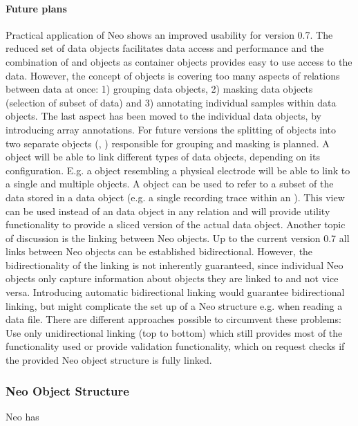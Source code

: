\paragraph{Future plans}
Practical application of Neo shows an improved usability for version 0.7. The reduced set of data objects facilitates data access and performance and the combination of  and  objects as container objects provides easy to use access to the data. However, the concept of  objects is covering too many aspects of relations between data at once: 1) grouping data objects, 2) masking data objects (selection of subset of data) and 3) annotating individual samples within data objects. The last aspect has been moved to the individual data objects, by introducing array annotations. For future versions the splitting of  objects into two separate objects (, ) responsible for grouping and masking is planned. A  object will be able to link different types of data objects, depending on its configuration. E.g. a  object resembling a physical electrode will be able to link to a single  and multiple  objects. A  object can be used to refer to a subset of the data stored in a data object (e.g. a single recording trace within an ). This view can be used instead of an data object in any relation and will provide utility functionality to provide a sliced version of the actual data object.
Another topic of discussion is the linking between Neo objects. Up to the current version 0.7 all links between Neo objects can be established bidirectional. However, the bidirectionality of the linking is not inherently guaranteed, since individual Neo objects only capture information about objects they are linked to and not vice versa. Introducing automatic bidirectional linking would guarantee bidirectional linking, but might complicate the set up of a Neo structure e.g. when reading a data file. There are different approaches possible to circumvent these problems: Use only unidirectional linking (top to bottom) which still provides most of the functionality used or provide validation functionality, which on request checks if the provided Neo object structure is fully linked.






\subsubsection{Neo Object Structure}
Neo has 



